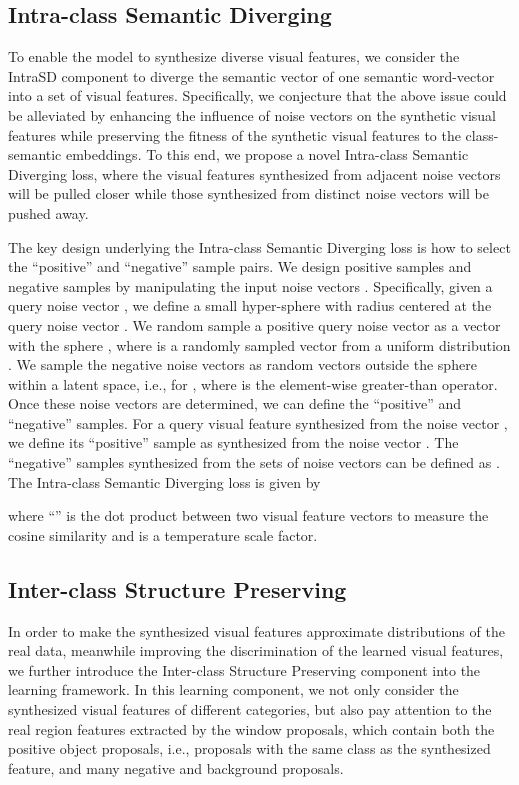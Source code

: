 \documentclass[10pt,twocolumn,letterpaper]{article}
\begin{document}
\subsection{Intra-class Semantic Diverging}

To enable the model to synthesize diverse visual features, we consider the IntraSD component to diverge the semantic vector of one semantic word-vector into a set of visual features.
Specifically, we conjecture that the above issue could be alleviated by enhancing the influence of noise vectors on the synthetic visual features while preserving the fitness of the synthetic visual features to the class-semantic embeddings. To this end, we propose a novel Intra-class Semantic Diverging loss, where the visual features synthesized from adjacent noise vectors will be pulled closer while those synthesized from distinct noise vectors will be pushed away.

The key design underlying the Intra-class Semantic Diverging loss is how to select the ``positive'' and ``negative'' sample pairs. We design positive samples and negative samples by manipulating the input noise vectors \cite{liu2021divco}. Specifically, given a query noise vector   , we define a small hyper-sphere with radius  centered at the query noise vector . We random sample a positive query noise vector  as a vector with the sphere     , where  is a randomly sampled vector from a uniform distribution   . We sample the negative noise vectors as random vectors outside the sphere within a latent space, i.e., 
 for , where  is the element-wise greater-than operator. Once these noise vectors are determined, we can define the ``positive'' and ``negative'' samples. For a query visual feature    synthesized from the noise vector , we define its ``positive'' sample as    synthesized from the noise vector . The  ``negative'' samples synthesized from the sets of noise vectors  can be defined as   . The Intra-class Semantic Diverging loss is given by

where ``'' is the dot product between two visual feature vectors to measure the cosine similarity and  is a temperature scale factor.

\subsection{Inter-class Structure Preserving}
In order to make the synthesized visual features approximate distributions of the real data, meanwhile improving the discrimination of the learned visual features, we further introduce the Inter-class Structure Preserving component into the learning framework. In this learning component, we not only consider the synthesized visual features of different categories, but also pay attention to the real region features extracted by the window proposals, which contain both the positive object proposals, i.e., proposals with the same class as the synthesized feature, and many negative and background proposals.
\end{document}
